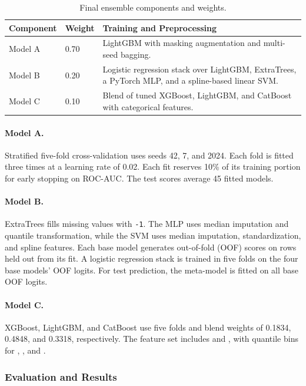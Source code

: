 \documentclass[../main.tex]{subfiles}
\begin{document}
\begin{table}[H]\centering\small
\begin{tabular}{@{}L{.15\linewidth}L{.11\linewidth}L{.67\linewidth}@{}}
\toprule
\textbf{Component} & \textbf{Weight} & \textbf{Training and Preprocessing} \\
\midrule
Model A & 0.70 & LightGBM with masking augmentation and multi-seed bagging. \\
Model B & 0.20 & Logistic regression stack over LightGBM, ExtraTrees, a PyTorch MLP, and a spline-based linear SVM. \\
Model C & 0.10 & Blend of tuned XGBoost, LightGBM, and CatBoost with categorical features. \\
\bottomrule
\end{tabular}
\caption{Final ensemble components and weights.}\label{tab:t1-models}
\end{table}

\paragraph{Model A.} Stratified five-fold cross-validation uses seeds 42, 7, and 2024. Each fold is fitted three times at a learning rate of 0.02. Each fit reserves 10\% of its training portion for early stopping on ROC-AUC. The test scores average 45 fitted models.

\paragraph{Model B.} ExtraTrees fills missing values with \texttt{-1}. The MLP uses median imputation and quantile transformation, while the SVM uses median imputation, standardization, and spline features. Each base model generates out-of-fold (OOF) scores on rows held out from its fit. A logistic regression stack is trained in five folds on the four base models' OOF logits. For test prediction, the meta-model is fitted on all base OOF logits.

\paragraph{Model C.} XGBoost, LightGBM, and CatBoost use five folds and blend weights of 0.1834, 0.4848, and 0.3318, respectively. The feature set includes  and , with quantile bins for , , and .

\subsubsection{Evaluation and Results}
\label{sec:t1-eval}
\end{document}
